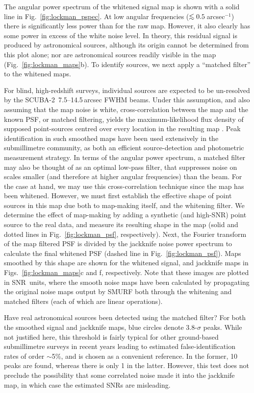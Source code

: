 \documentclass[useAMS,usenatbib,nofootinbib]{mn2e}
\newcommand{\snr}{SNR}
\newcommand{\scuba}{SCUBA-2}
\def\lsim{\mathrel{\lower2.5pt\vbox{\lineskip=0pt\baselineskip=0pt
          \hbox{$<$}\hbox{$\sim$}}}}
\begin{document}
The angular power spectrum of the whitened signal map is shown with a
solid line in Fig.~\ref{fig:lockman_pspec}. At low angular frequencies
($\lsim 0.5$\,arcsec$^{-1}$) there is significantly less power than
for the raw map. However, it also clearly has some power in excess of
the white noise level. In theory, this residual signal is produced by
astronomical sources, although its origin cannot be determined from
this plot alone; nor are astronomical sources readily visible in the
map (Fig.~\ref{fig:lockman_maps}b). To identify sources, we next apply
a ``matched filter'' to the whitened maps.

For blind, high-redshift surveys, individual sources are expected to
be un-resolved by the \scuba\ 7.5--14.5\,arcsec FWHM beams. Under this
assumption, and also assuming that the map noise is white,
cross-correlation between the map and the known PSF, or matched
filtering, yields the maximum-likelihood flux density of supposed
point-sources centred over every location in the resulting map
\citep[an extremely well-known result throughout astronomy,
see][]{stetson1987}. Peak identification in such smoothed maps have
been used extensively in the submillimetre community, as both an
efficient source-detection and photometric measurement strategy. In
terms of the angular power spectrum, a matched filter may also be
thought of as an optimal low-pass filter, that suppresses noise on
scales smaller (and therefore at higher angular frequencies) than the
beam. For the case at hand, we may use this cross-correlation
technique since the map has been whitened. However, we must first
establish the effective shape of point sources in this map due both to
map-making itself, and the whitening filter. We determine the effect
of map-making by adding a synthetic (and high-\snr) point source to
the real data, and measure its resulting shape in the map (solid and
dotted lines in Fig.~\ref{fig:lockman_psf}, respectively). Next, the
Fourier transform of the map filtered PSF is divided by the jackknife
noise power spectrum to calculate the final whitened PSF (dashed line
in Fig.~\ref{fig:lockman_psf}). Maps smoothed by this shape are shown
for the whitened signal, and jackknife maps in
Figs.~\ref{fig:lockman_maps}c and f, respectively. Note that these
images are plotted in \snr\ units, where the smooth noise maps have
been calculated by propagating the original noise maps output by SMURF
both through the whitening and matched filters (each of which are
linear operations).

Have real astronomical sources been detected using the matched filter?
For both the smoothed signal and jackknife maps, blue circles denote
3.8-$\sigma$ peaks. While not justified here, this threshold is fairly
typical for other ground-based submillimetre surveys in recent years
\citep[e.g.,][]{coppin2006,perera2008,2009ApJ...707.1201W} leading to
estimated false-identification rates of order $\sim$5\%, and is chosen
as a convenient reference. In the former, 10 peaks are found, whereas
there is only 1 in the latter. However, this test does not preclude
the possibility that some correlated noise made it into the jackknife
map, in which case the estimated \snr s are misleading.
\end{document}

